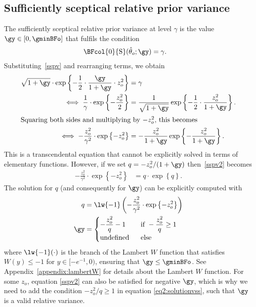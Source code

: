 \begin{subappendices}
  \renewcommand{\thesection}{\Alph{section}}

\section{Sufficiently sceptical relative prior variance}
\label{appendix:ssrv}
The sufficiently sceptical relative prior variance at level $\gamma$ is the
value $\gy \in [0, \gminBFo]$ that fulfils the condition
\begin{align}
  \label{sspv}
  \BFcol{0}{\text{S}}(\hat{\theta}_o; \gy)
  &= \gamma.
\end{align}
Substituting~\eqref{sspv} and rearranging terms, we obtain
\begin{align}
  \label{sspv2}
  \sqrt{1 + \gy} \cdot
  \exp\left\{-\frac{1}{2} \cdot
  \frac{\gy}{1 + \gy} \cdot z^2_o\right\}
  &= \gamma \nonumber \\
  \iff \frac{1}{\gamma} \cdot \exp\left\{-\frac{z_o^2}{2}\right\}
  &= \frac{1}{\sqrt{1 + \gy}} \exp\left\{-\frac{1}{2} \cdot
  \frac{z_o^2}{1 + \gy}\right\}. \nonumber
  \\
  \intertext{Squaring both sides and multiplying by $-z_o^2$, this becomes}
  \iff -\frac{z_o^2}{\gamma^2} \cdot \exp\left\{-z_o^2\right\}
  &= -\frac{z_o^2}{1 + \gy}
  \exp\left\{-\frac{z_o^2}{1 + \gy}\right\}.
\end{align}
This is a transcendental equation that cannot be explicitly solved in terms of
elementary functions. However, if we set $q = -z_o^2/(1 + \gy)$
then~\eqref{sspv2} becomes
\begin{align*}
  -\frac{z_o^2}{\gamma^2} \cdot \exp\left\{-z_o^2\right\}
  &= q \cdot \exp\left\{q\right\}.
\end{align*}
The solution for $q$ (and consequently for $\gy$) can be explicitly computed
with
\begin{align}
\label{eq2:solutionvss}
  q &= \lw{-1}\left(-\frac{z_o^2}{\gamma^2} \cdot \exp\left\{-z_o^2\right\}\right)
  \nonumber \\
  \gy &=
  \begin{cases}
    -\dfrac{z_o^2}{q} - 1 & ~~ \text{if} ~ -\dfrac{z_o^2}{q} \geq 1 \\
    \text{undefined} & ~~ \text{else}
  \end{cases}
\end{align}
where $\lw{-1}(\cdot)$ is the branch of the Lambert $W$ function that satisfies
$W(y) \leq -1$ for $y \in [-e^{-1}, 0)$, ensuring that $\gy \leq \gminBFo$. See
Appendix~\ref{appendix:lambertW} for details about the Lambert $W$ function. For
some $z_o$, equation \eqref{sspv2} can also be satisfied for negative $\gy$,
which is why we need to add the condition $-z_o^2/q \geq 1$ in equation
\eqref{eq2:solutionvss}, such that $\gy$ is a valid relative variance.


\end{subappendices}
